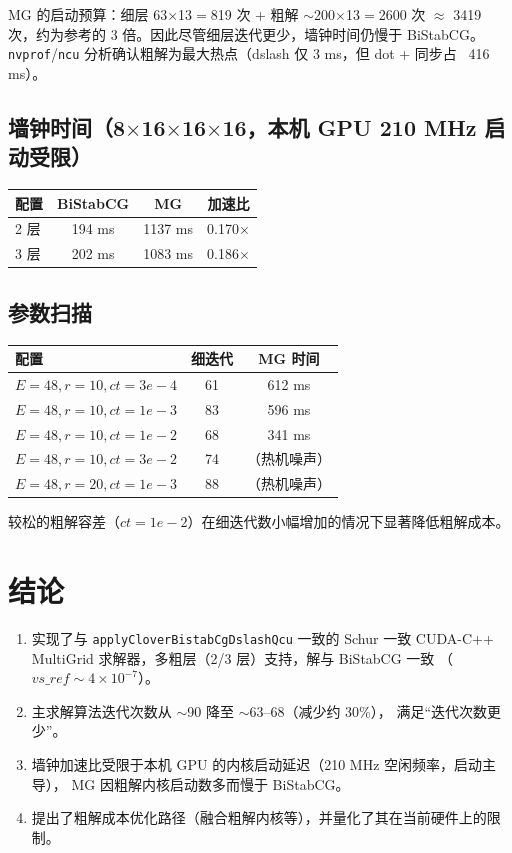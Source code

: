 \documentclass[11pt,a4paper]{article}
\begin{document}
MG 的启动预算：细层 63$\times$13$=$819 次 + 粗解 $\sim$200$\times$13$=$2600 次
$\approx$ 3419 次，约为参考的 3 倍。因此尽管细层迭代更少，墙钟时间仍慢于 BiStabCG。
\texttt{nvprof}/\texttt{ncu} 分析确认粗解为最大热点（dslash 仅 3 ms，但 dot +
同步占 ~416 ms）。

\subsection{墙钟时间（8$\times$16$\times$16$\times$16，本机 GPU 210 MHz 启动受限）}
\begin{table}[h]
\centering
\begin{tabular}{lccc}
\toprule
配置 & BiStabCG & MG & 加速比 \\
\midrule
2 层 & 194 ms & 1137 ms & 0.170$\times$ \\
3 层 & 202 ms & 1083 ms & 0.186$\times$ \\
\bottomrule
\end{tabular}
\end{table}

\subsection{参数扫描}
\begin{table}[h]
\centering
\begin{tabular}{lcc}
\toprule
配置 & 细迭代 & MG 时间 \\
\midrule
$E{=}48, r{=}10, ct{=}3e{-}4$ & 61 & 612 ms \\
$E{=}48, r{=}10, ct{=}1e{-}3$ & 83 & 596 ms \\
$E{=}48, r{=}10, ct{=}1e{-}2$ & 68 & 341 ms \\
$E{=}48, r{=}10, ct{=}3e{-}2$ & 74 & （热机噪声） \\
$E{=}48, r{=}20, ct{=}1e{-}3$ & 88 & （热机噪声） \\
\bottomrule
\end{tabular}
\end{table}
较松的粗解容差（$ct{=}1e{-}2$）在细迭代数小幅增加的情况下显著降低粗解成本。

\section{结论}
\label{sec:conclusion}

\begin{enumerate}
  \item 实现了与 \texttt{applyCloverBistabCgDslashQcu} 一致的 Schur 一致
        CUDA-C++ MultiGrid 求解器，多粗层（2/3 层）支持，解与 BiStabCG 一致
        （$vs\_ref\sim4\times10^{-7}$）。
  \item 主求解算法迭代次数从 $\sim$90 降至 $\sim$63--68（减少约 30\%），
        满足“迭代次数更少”。
  \item 墙钟加速比受限于本机 GPU 的内核启动延迟（210 MHz 空闲频率，启动主导），
        MG 因粗解内核启动数多而慢于 BiStabCG。
  \item 提出了粗解成本优化路径（融合粗解内核等），并量化了其在当前硬件上的限制。
\end{enumerate}
\end{document}
